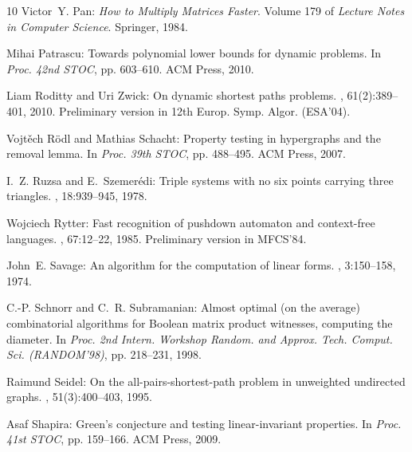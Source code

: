 \begin{thebibliography}{10}
{\sc Victor~Y. Pan}: {\em How to Multiply Matrices Faster}.
\newblock Volume 179 of {\em Lecture Notes in Computer Science}.
\newblock Springer, 1984.

{\sc Mihai Patrascu}: Towards polynomial lower bounds for dynamic problems.
\newblock In {\em Proc. 42nd STOC}, pp. 603--610. ACM Press, 2010.
\newblock [\epfmtdoi{10.1145/1806689.1806772}]

{\sc Liam Roditty and Uri Zwick}: On dynamic shortest paths problems.
, 61(2):389--401, 2010.
\newblock Preliminary version in 12th Europ. Symp. Algor. (ESA'04).
\newblock [\epfmtdoi{10.1007/s00453-010-9401-5}]

{\sc Vojt{\v e}ch R{\"o}dl and Mathias Schacht}: Property testing in
  hypergraphs and the removal lemma.
\newblock In {\em Proc. 39th STOC}, pp. 488--495. ACM Press, 2007.
\newblock [\epfmtdoi{10.1145/1250790.1250862}]

{\sc I.~Z. Ruzsa and E.~Szemer\'{e}di}: Triple systems with no six points
  carrying three triangles.
, 18:939--945,
  1978.

{\sc Wojciech Rytter}: Fast recognition of pushdown automaton and context-free
  languages.
, 67:12--22, 1985.
\newblock Preliminary version in MFCS'84.
\newblock [\epfmtdoi{10.1016/S0019-9958(85)80024-3}]

{\sc John~E. Savage}: An algorithm for the computation of linear forms.
, 3:150--158, 1974.
\newblock [\epfmtdoi{10.1137/0203011}]

{\sc C.-P. Schnorr and C.~R. Subramanian}: Almost optimal (on the average)
  combinatorial algorithms for {B}oolean matrix product witnesses, computing
  the diameter.
\newblock In {\em Proc. 2nd Intern. Workshop Random. and Approx. Tech. Comput.
  Sci. (RANDOM'98)}, pp. 218--231, 1998.
\newblock [\epfmtdoi{10.1007/3-540-49543-6\_18}]

{\sc Raimund Seidel}: On the all-pairs-shortest-path problem in unweighted
  undirected graphs.
, 51(3):400--403, 1995.

{\sc Asaf Shapira}: {G}reen's conjecture and testing linear-invariant
  properties.
\newblock In {\em Proc. 41st STOC}, pp. 159--166. ACM Press, 2009.
\newblock [\epfmtdoi{10.1145/1536414.1536438}]


\end{thebibliography}
